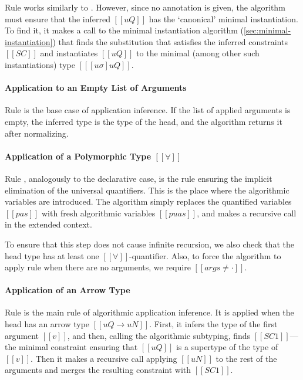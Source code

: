   Rule 
  works similarly to .
  However, since no annotation is given,
  the algorithm must ensure that the inferred $[[uQ]]$
  has the `canonical' minimal instantiation.
  To find it, it makes a call to the minimal instantiation algorithm 
  (\cref{sec:minimal-instantiation})
  that finds the substitution that satisfies the inferred constraints $[[SC]]$ and
  instantiates $[[uQ]]$ to the minimal (among other such instantiations)
  type $[[ [uσ]uQ ]]$.

\paragraph{Application to an Empty List of Arguments}
  Rule 
  is the base case of application inference. 
  If the list of applied arguments is empty, 
  the inferred type is the type of the head,
  and the algorithm returns it after normalizing.

\paragraph{Application of a Polymorphic Type $[[∀]]$}
  Rule ,
  analogously to the declarative case,
  is the rule ensuring the implicit elimination of the universal quantifiers. 
  This is the place where the algorithmic variables are introduced.
  The algorithm simply replaces the quantified variables 
  $[[pas]]$ with fresh algorithmic variables $[[puas]]$,
  and makes a recursive call in the extended context.

  To ensure that this step does not cause infinite recursion, 
  we also check that the head type has at least one 
  $[[∀]]$-quantifier. Also, to force the algorithm to
  apply rule  when  
  there are no arguments, we require $[[args ≠ ·]]$.

\paragraph{Application of an Arrow Type}
  Rule 
  is the main rule of algorithmic application inference.
  It is applied when the head has an arrow type $[[uQ → uN]]$.
  First, it infers the type of the first argument $[[v]]$,
  and then, calling the algorithmic subtyping,
  finds $[[SC1]]$---the minimal constraint ensuring that 
  $[[uQ]]$ is a supertype of the type of $[[v]]$.
  Then it makes a recursive call applying $[[uN]]$ to the rest of the arguments 
  and merges the resulting constraint with $[[SC1]]$.

